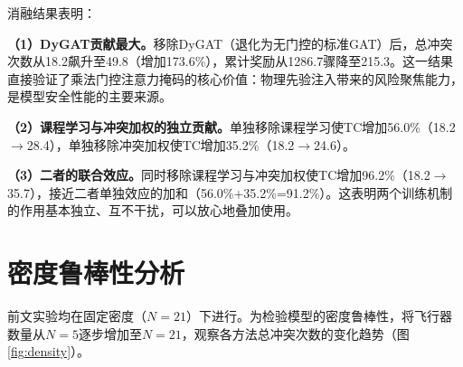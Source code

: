 \documentclass[12pt,a4paper,UTF8]{ctexbook}
\begin{document}
\begin{table}[H]
    \centering
    \caption{消融实验（$n=5$）}
    \label{tab:ablation}
\end{table}

消融结果表明：

\textbf{（1）DyGAT贡献最大。}移除DyGAT（退化为无门控的标准GAT）后，总冲突次数从18.2飙升至49.8（增加173.6\%），累计奖励从1286.7骤降至215.3。这一结果直接验证了乘法门控注意力掩码的核心价值：物理先验注入带来的风险聚焦能力，是模型安全性能的主要来源。

\textbf{（2）课程学习与冲突加权的独立贡献。}单独移除课程学习使TC增加56.0\%（18.2$\to$28.4），单独移除冲突加权使TC增加35.2\%（18.2$\to$24.6）。

\textbf{（3）二者的联合效应。}同时移除课程学习与冲突加权使TC增加96.2\%（18.2$\to$35.7），接近二者单独效应的加和（56.0\%+35.2\%=91.2\%）。这表明两个训练机制的作用基本独立、互不干扰，可以放心地叠加使用。

\section{密度鲁棒性分析}

前文实验均在固定密度（$N=21$）下进行。为检验模型的密度鲁棒性，将飞行器数量从$N=5$逐步增加至$N=21$，观察各方法总冲突次数的变化趋势（图\ref{fig:density}）。
\end{document}
